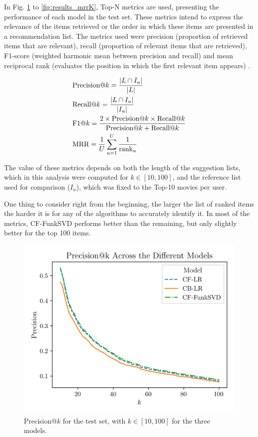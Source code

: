 \documentclass[conference]{IEEEtran}
\begin{document}
In Fig. \ref{fig:results_precisionK} to \ref{fig:results_mrrK}, Top-N metrics are used, presenting the performance of each model in the test set. These metrics intend to express the relevance of the items retrieved or the order in which these items are presented in a recommendation list. The metrics used were precision (proportion of retrieved items that are relevant), recall (proportion of relevant items that are retrieved), F1-score (weighted harmonic mean between precision and recall) and mean reciprocal rank (evaluates the position in which the first relevant item appears) \cite{9379914, ekstrand2020lenskit}.

\begin{align}
&\text{Precision@}k = \frac{|L \cap I_u|}{|L|} \notag \\
&\text{Recall@}k = \frac{|L \cap I_u|}{|I_u|} \notag \\
&\text{F1@}k = \frac{2 \times \text{Precision@}k \times \text{Recall@}k}{\text{Precision@}k + \text{Recall@}k} \notag \\
&\text{MRR} = \frac{1}{U} \sum_{u=1}^{U} \frac{1}{\text{rank}_u}
\end{align}

The value of these metrics depends on both the length of the suggestion lists, which in this analysis were computed for $k \in [10,100]$, and the reference list used for comparison ($I_u$), which was fixed to the Top-10 movies per user.

One thing to consider right from the beginning, the larger the list of ranked items the harder it is for any of the algorithms to accurately identify it. In most of the metrics, CF-FunkSVD performs better than the remaining, but only slightly better for the top 100 items.


\begin{figure}[H]
    \centering
    \includegraphics[width=1\linewidth]{assets/results_precisionK.png}
    \caption{Precision@$k$ for the test set, with $k \in [10,100]$ for the three models.}
    \label{fig:results_precisionK}
\end{figure}
\end{document}
